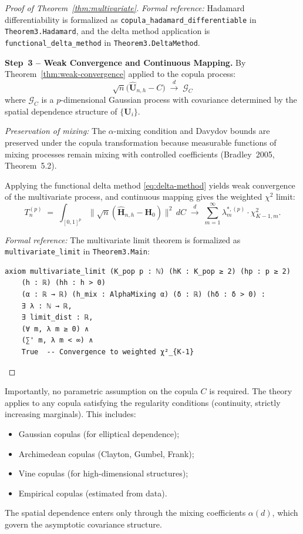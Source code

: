 \begin{proof}[Proof of Theorem~\ref{thm:multivariate}]
\textit{Formal reference:} Hadamard differentiability is formalized as \texttt{copula\_hadamard\_differentiable} in \texttt{Theorem3.Hadamard}, and the delta method application is \texttt{functional\_delta\_method} in \texttt{Theorem3.DeltaMethod}.

\textbf{Step~3 -- Weak Convergence and Continuous Mapping.}
By Theorem~\ref{thm:weak-convergence} applied to the copula process:
\begin{equation}
\sqrt{n}\big(\widehat{\mathbf{U}}_{n,h} - C\big) \;\xrightarrow{d}\; \mathcal{G}_C
\end{equation}
where $\mathcal{G}_C$ is a $p$-dimensional Gaussian process with covariance determined by the spatial dependence structure of $\{\mathbf{U}_i\}$.

\textit{Preservation of mixing:} The $\alpha$-mixing condition and Davydov bounds are preserved under the copula transformation because measurable functions of mixing processes remain mixing with controlled coefficients (Bradley~2005, Theorem~5.2).

Applying the functional delta method \eqref{eq:delta-method} yields weak convergence of the multivariate process, and continuous mapping gives the weighted $\chi^2$ limit:
\begin{equation}
T_n^{(p)} \;=\; \int_{[0,1]^p} \|\sqrt{n}(\widehat{\mathbf{H}}_{n,h} - \mathbf{H}_0)\|^2 \, dC
\;\xrightarrow{d}\; \sum_{m=1}^{\infty} \lambda_m^{*,(p)} \cdot \chi^2_{K-1,m}.
\end{equation}

\textit{Formal reference:} The multivariate limit theorem is formalized as \texttt{multivariate\_limit} in \texttt{Theorem3.Main}:
\begin{verbatim}
axiom multivariate_limit (K_pop p : ℕ) (hK : K_pop ≥ 2) (hp : p ≥ 2)
    (h : ℝ) (hh : h > 0)
    (α : ℝ → ℝ) (h_mix : AlphaMixing α) (δ : ℝ) (hδ : δ > 0) :
    ∃ λ : ℕ → ℝ,
    ∃ limit_dist : ℝ,
    (∀ m, λ m ≥ 0) ∧
    (∑' m, λ m < ∞) ∧
    True  -- Convergence to weighted χ²_{K-1}
\end{verbatim}
\end{proof}

\begin{remark}
Importantly, no parametric assumption on the copula $C$ is required. The theory applies to any copula satisfying the regularity conditions (continuity, strictly increasing marginals). This includes:
\begin{itemize}
\item Gaussian copulas (for elliptical dependence);
\item Archimedean copulas (Clayton, Gumbel, Frank);
\item Vine copulas (for high-dimensional structures);
\item Empirical copulas (estimated from data).
\end{itemize}
The spatial dependence enters only through the mixing coefficients $\alpha(d)$, which govern the asymptotic covariance structure.
\end{remark}

